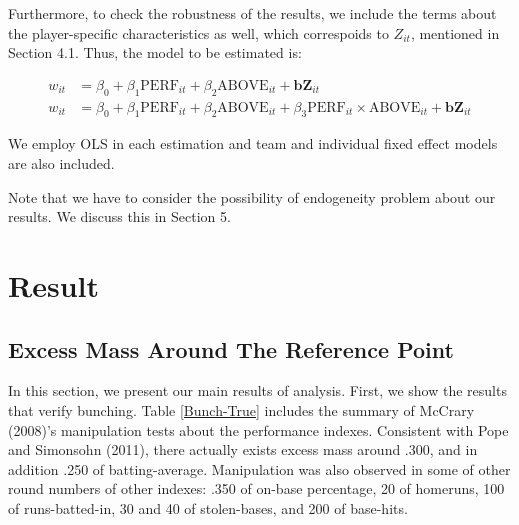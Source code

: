 \documentclass[dvipdfmx, 12pt]{article}
\begin{document}
  Furthermore, to check the robustness of the results, we include the terms about the player-specific characteristics as well, which correspoids to $Z_{it}$, mentioned in Section 4.1. Thus, the model to be estimated is:

  \begin{align*}
    w_{it} & = \beta_0 + \beta_1 \text{PERF}_{it} + \beta_2 \text{ABOVE}_{it} + \mathbf{b} \mathbf{Z}_{it} \\
    w_{it} &= \beta_0 + \beta_1 \text{PERF}_{it} + \beta_2 \text{ABOVE}_{it} + \beta_3 \text{PERF}_{it} \times \text{ABOVE}_{it} + \mathbf{b} \mathbf{Z}_{it}
  \end{align*}

  We employ OLS in each estimation and team and individual fixed effect models are also included.

  Note that we have to consider the possibility of endogeneity problem about our results. We discuss this in Section 5.

\section{Result}
\subsection{Excess Mass Around The Reference Point}

In this section, we present our main results of analysis. First, we show the results that verify bunching. Table \ref{Bunch-True} includes the summary of McCrary (2008)'s manipulation tests about the performance indexes. Consistent with Pope and Simonsohn (2011), there actually exists excess mass around .300, and in addition .250 of batting-average. Manipulation was also observed in some of other round numbers of other indexes: .350 of on-base percentage, 20 of homeruns, 100 of runs-batted-in, 30 and 40 of stolen-bases, and 200 of base-hits.
\end{document}
